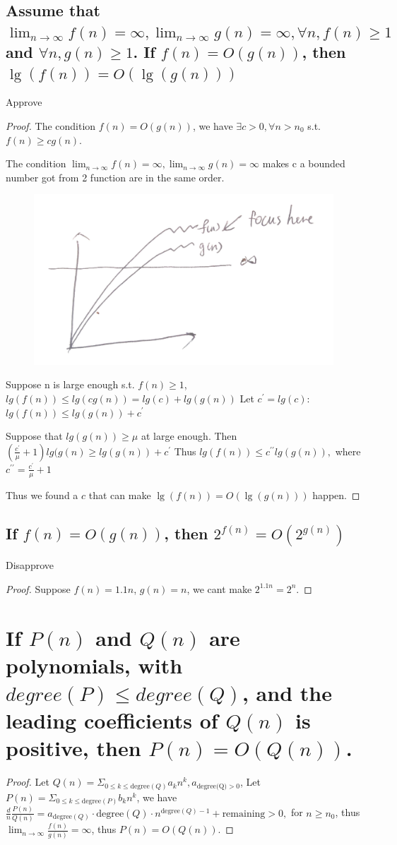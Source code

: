 \documentclass[a4paper]{article}
\begin{document}
\subsection{Assume that $\lim _{n \rightarrow \infty} f(n)=\infty, \lim _{n \rightarrow \infty} g(n)=\infty, \forall n, f(n) \geq 1$ and $\forall n, g(n) \geq 1$. If $f(n)=O(g(n))$, then $\lg (f(n))=O(\lg (g(n)))$}\label{prove}
Approve
\begin{proof}
The condition $ f(n)=O(g(n))$, we have $\exists c>0, \forall n>n_0$ s.t. $f(n)\geq cg(n)$.

The condition $\lim _{n \rightarrow \infty} f(n)=\infty, \lim _{n \rightarrow \infty} g(n)=\infty$ makes c a bounded number got from 2 function are in the same order. 

\begin{figure}[h]
  \centering
  \includegraphics[width=0.4\linewidth]{./hw01-03-01.jpg}
\end{figure}

Suppose n is large enough s.t. $f(n)\geq 1$, $lg(f(n)) \leq lg(c g(n)) = lg(c) + lg(g(n))$
Let $c^{\prime}=lg(c)$: $lg(f(n)) \leq lg(g(n)) +c^{\prime}$

Suppose that $lg(g(n)) \geq \mu$ at large enough.
Then $(\frac{c^{\prime}}{\mu}+1)lg(g(n) \geq lg(g(n)) + c^{\prime}$
Thus $lg(f(n)) \leq c^{\prime\prime} lg(g(n)),$ where $c^{\prime\prime} = \frac{c^{\prime}}{\mu}+1$ 

Thus we found a $c$ that can make $\lg (f(n))=O(\lg (g(n)))$ happen.
\end{proof}
\subsection{ If $ f(n)=O(g(n)) $, then $2^{ f(n)}=O\left(2^ {g(n)}\right)$}
Disapprove
\begin{proof}
Suppose $f(n)=1.1n$, $g(n)=n$, we cant make $2^{1.1n}= 2^n$.
\end{proof}

\section{If $P(n)$ and $Q(n)$ are polynomials, with $degree(P) \leq degree (Q)$, and the leading coefficients of $Q(n)$ is positive, then $P(n) = O(Q(n))$.}
\begin{proof}
  Let $Q(n)= \Sigma_{0 \leq k\leq \text{degree}(Q)} a_k n^k, a_{\text{degree(Q)}>0}$, Let $P(n)= \Sigma_{0 \leq k\leq \text{degree}(P)} b_k n^k$, we have $\frac{d}{n} \frac{P(n)} {Q(n)}=a_{\text{degree}(Q)}\cdot{\text{degree}(Q)}\cdot n^{\text{degree}(Q)-1}+\text{remaining}>0,$ for $n\geq n_0$, thus $\lim _{n \rightarrow \infty} \frac{f(n)}{g(n)}=\infty$, thus $P(n)=O(Q(n))$.
\end{proof}
\end{document}
